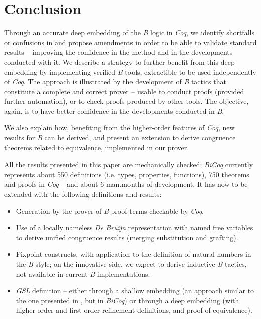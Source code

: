 \documentclass{llncs}
\begin{document}
\section{Conclusion}\label{sc_conc}

Through an accurate deep embedding of the \emph{B} logic in \emph{Coq}, we identify shortfalls 
or confusions in \cite{abr:1} and propose amendments in order to be able to validate standard
results -- improving the confidence in the method and in the developments conducted with it.
We describe a strategy to further benefit from this deep embedding by implementing verified 
\emph{B} tools, extractible to be used independently of \emph{Coq}. The approach is 
illustrated by the development of \emph{B} tactics that constitute a complete and correct 
prover -- usable to conduct proofs (provided further automation), or to check proofs produced 
by other tools. The objective, again, is to have better confidence in the developments 
conducted in \emph{B}.

We also explain how, benefiting from the higher-order features of \emph{Coq}, new results for 
\emph{B} can be derived, and present an extension to derive congruence theorems related to 
equivalence, implemented in our prover.

All the results presented in this paper are mechanically checked; \emph{BiCoq} currently 
represents about 550 definitions (i.e. types, properties, functions), 750 theorems and proofs 
in \emph{Coq} -- and about 6 man.months of development. It has now to be extended with the 
following definitions and results:
\begin{itemize}
\item Generation by the prover of \emph{B} proof terms checkable by \emph{Coq}.
\item Use of a locally nameless \emph{De Bruijn} representation with named free variables to 
derive unified congruence results (merging substitution and grafting).
\item Fixpoint constructs, with application to the definition of natural numbers in the 
\emph{B} style; on the innovative side, we expect to derive inductive \emph{B} tactics, not 
available in current \emph{B} implementations.
\item \emph{GSL} definition -- either through a shallow embedding (an approach similar to the
one presented in \cite{bod:1b}, but in \emph{BiCoq}) or through a deep embedding (with 
higher-order and first-order refinement definitions, and proof of equivalence).
\end{itemize}
\end{document}
